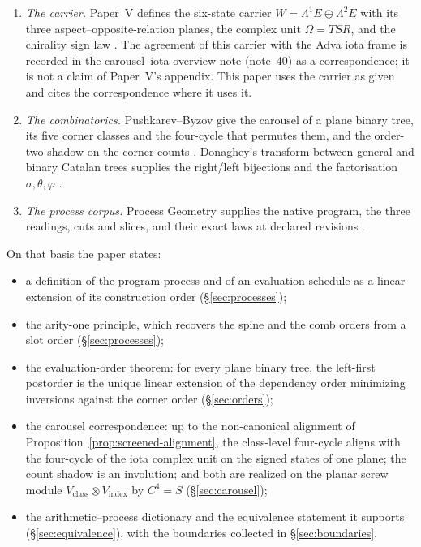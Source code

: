 \begin{enumerate}
\item \emph{The carrier.}  Paper~V defines the six-state carrier
  $W=\Lambda^{1}E\oplus\Lambda^{2}E$ with its three aspect--opposite-relation
  planes, the complex unit $\Omega=TSR$, and the chirality sign law
  \cite{Yuan2026AEGPaperFive}.  The agreement of this carrier with the Adva iota
  frame is recorded in the carousel--iota overview note (note~40) as a
  correspondence; it is not a claim of Paper~V's appendix.  This paper uses the
  carrier as given and cites the correspondence where it uses it.
\item \emph{The combinatorics.}  Pushkarev--Byzov give the carousel of a plane
  binary tree, its five corner classes and the four-cycle that permutes them, and
  the order-two shadow on the corner counts \cite{PushkarevByzov2014}.  Donaghey's
  transform between general and binary Catalan trees supplies the right/left
  bijections and the factorisation $\sigma,\theta,\varphi$
  \cite{Donaghey1980,PushkarevByzov2014}.
\item \emph{The process corpus.}  Process Geometry supplies the native program,
  the three readings, cuts and slices, and their exact laws at declared revisions
  \cite{AdvaProcessCore2026,ProcessGeometryCore2026}.
\end{enumerate}

On that basis the paper states:

\begin{itemize}
\item a definition of the program process and of an evaluation schedule as a linear
  extension of its construction order (\S\ref{sec:processes});
\item the arity-one principle, which recovers the spine and the comb orders from a
  slot order (\S\ref{sec:processes});
\item the evaluation-order theorem: for every plane binary tree, the left-first
  postorder is the unique linear extension of the dependency order minimizing
  inversions against the corner order (\S\ref{sec:orders});
\item the carousel correspondence: up to the non-canonical alignment of
  Proposition~\ref{prop:screened-alignment}, the class-level four-cycle aligns with
  the four-cycle of the iota complex unit on the signed states of one plane; the
  count shadow is an involution; and
  both are realized on the planar screw module
  $V_{\mathrm{class}}\otimes V_{\mathrm{index}}$ by $C^{4}=S$
  (\S\ref{sec:carousel});
\item the arithmetic--process dictionary and the equivalence statement it supports
  (\S\ref{sec:equivalence}), with the boundaries collected in
  \S\ref{sec:boundaries}.
\end{itemize}


